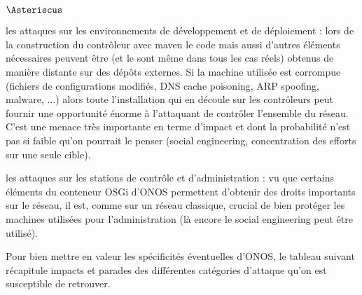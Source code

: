 \begin{list}{$\Asteriscus$}{}
\item les attaques sur les environnements de développement et de déploiement : lors de la construction du contrôleur avec maven le code mais aussi d'autres éléments nécessaires peuvent être (et le sont même dans tous les cas réels) obtenus de manière distante sur des dépôts externes. Si la machine utilisée est corrompue (fichiers de configurations modifiés, DNS cache poisoning, ARP spoofing, malware, ...) alors toute l'installation qui en découle sur les contrôleurs peut fournir une opportunité énorme à l'attaquant de contrôler l'ensemble du réseau. C'est une menace très importante en terme d'impact et dont la probabilité n'est pas si faible qu'on pourrait le penser (social engineering, concentration des efforts sur une seule cible).

\item les attaques sur les stations de contrôle et d'administration : vu que certains éléments du conteneur OSGi d'ONOS permettent d'obtenir des droits importants sur le réseau, il est, comme sur un réseau classique, crucial de bien protéger les machines utilisées pour l'administration (là encore le social engineering peut être utilisé).

\end{list}

Pour bien mettre en valeur les spécificités éventuelles d'ONOS, le tableau suivant récapitule impacts et parades des différentes catégories d'attaque qu'on est susceptible de retrouver.

